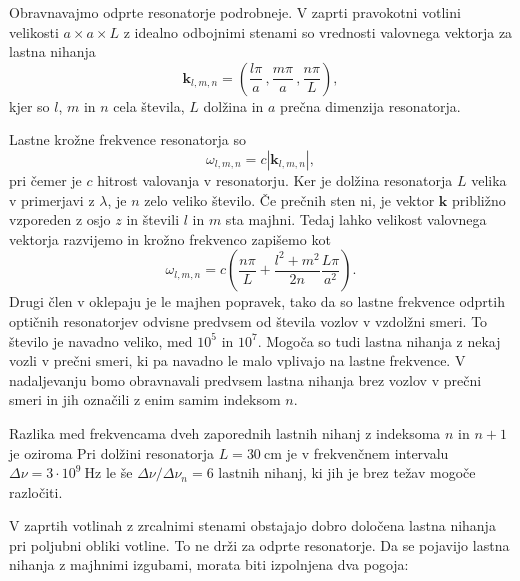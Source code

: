 Obravnavajmo odprte resonatorje podrobneje. V zaprti pravokotni votlini velikosti
$a\times a\times L$ z idealno odbojnimi stenami so vrednosti
valovnega vektorja za lastna nihanja 
\begin{equation}
\mathbf{k}_{l,m,n}=\left(\frac{l\pi}{a}\,,\frac{m\pi}{a}\,,\frac{n\pi}{L}\right)\!\!,\label{eq:k-votlina}
\end{equation}
kjer so $l$, $m$ in $n$ cela števila, $L$ dolžina in $a$ prečna
dimenzija resonatorja. 

Lastne krožne frekvence resonatorja so 
\begin{equation}
\omega_{l,m,n}=c|\mathbf{k}_{l,m,n}|,\label{eq:omega-votlina}
\end{equation}
pri čemer je $c$ hitrost valovanja v resonatorju.
Ker je dolžina resonatorja $L$ velika v primerjavi z $\lambda$, je $n$
zelo veliko število. Če prečnih sten ni, je vektor $\mathbf{k}$ približno
vzporeden z osjo $z$ in števili $l$ in $m$ sta majhni. Tedaj
lahko velikost valovnega vektorja razvijemo in krožno frekvenco zapišemo kot
\begin{equation}
\omega_{l,m,n}=c\left(\frac{n\pi}{L}+\frac{l^{2}+m^{2}}{2n}\frac{L \pi}{a^{2}}\right)\!\!.
\label{eq:delta-omega-resonator-razvoj}
\end{equation}
Drugi člen v oklepaju je le majhen popravek, tako da so
lastne frekvence odprtih optičnih resonatorjev odvisne predvsem od
števila vozlov v vzdolžni smeri. To število je navadno veliko, med $10^{5}$
in $10^{7}$. Mogoča so tudi lastna nihanja z nekaj vozli v prečni
smeri, ki pa navadno le malo vplivajo na lastne frekvence. V nadaljevanju
bomo obravnavali predvsem lastna nihanja brez vozlov v prečni smeri in
jih označili z enim samim indeksom $n$.

Razlika med frekvencama dveh zaporednih lastnih nihanj z
indeksoma 
$n$ in $n+1$ je
oziroma
Pri dolžini resonatorja $L=30~\si{\centi\metre}$ je v frekvenčnem
intervalu $\Delta \nu = 3\cdot10^{9}~\si{\hertz}$ le še $\Delta \nu /\Delta \nu_n = 6$ lastnih 
nihanj, ki jih je brez težav mogoče razločiti.

V zaprtih votlinah z zrcalnimi stenami obstajajo dobro določena lastna
nihanja pri poljubni obliki votline. To ne drži za odprte resonatorje.
Da se pojavijo lastna nihanja z majhnimi izgubami, morata
biti izpolnjena dva pogoja:

